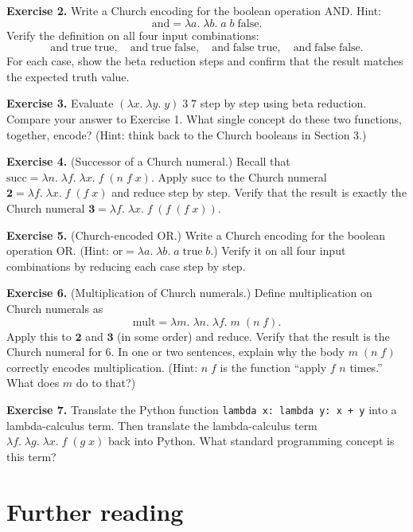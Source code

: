 \documentclass[11pt]{article}
\begin{document}
\bigskip
\textbf{Exercise 2.}\label{ex:lambda:2} Write a Church encoding for the
boolean operation AND\@. Hint:
\[
  \text{and} = \lambda a.\; \lambda b.\; a\; b\; \text{false}.
\]
Verify the definition on all four input combinations:
\[
  \text{and}\;\text{true}\;\text{true},\quad
  \text{and}\;\text{true}\;\text{false},\quad
  \text{and}\;\text{false}\;\text{true},\quad
  \text{and}\;\text{false}\;\text{false}.
\]
For each case, show the beta reduction steps and confirm that the result
matches the expected truth value.

\bigskip
\textbf{Exercise 3.}\label{ex:lambda:3} Evaluate $(\lambda x.\; \lambda y.\; y)\; 3\; 7$ step by step using beta reduction. Compare your answer to Exercise 1. What single concept do these two functions, together, encode? (Hint: think back to the Church booleans in Section 3.)

\bigskip
\textbf{Exercise 4.}\label{ex:lambda:4} (Successor of a Church numeral.) Recall that $\text{succ} = \lambda n.\; \lambda f.\; \lambda x.\; f\;(n\; f\; x)$. Apply $\text{succ}$ to the Church numeral $\mathbf{2} = \lambda f.\; \lambda x.\; f\;(f\; x)$ and reduce step by step. Verify that the result is exactly the Church numeral $\mathbf{3} = \lambda f.\; \lambda x.\; f\;(f\;(f\; x))$.

\bigskip
\textbf{Exercise 5.}\label{ex:lambda:5} (Church-encoded OR.) Write a Church encoding for the boolean operation OR\@. (Hint: $\text{or} = \lambda a.\; \lambda b.\; a\; \text{true}\; b$.) Verify it on all four input combinations by reducing each case step by step.

\bigskip
\textbf{Exercise 6.}\label{ex:lambda:6} (Multiplication of Church numerals.) Define multiplication on Church numerals as
\[
  \text{mult} = \lambda m.\; \lambda n.\; \lambda f.\; m\;(n\; f).
\]
Apply this to $\mathbf{2}$ and $\mathbf{3}$ (in some order) and reduce. Verify that the result is the Church numeral for $6$. In one or two sentences, explain why the body $m\;(n\; f)$ correctly encodes multiplication. (Hint: $n\; f$ is the function ``apply $f$ $n$ times.'' What does $m$ do to that?)

\bigskip
\textbf{Exercise 7.}\label{ex:lambda:7} Translate the Python function \texttt{lambda x: lambda y: x + y} into a lambda-calculus term. Then translate the lambda-calculus term $\lambda f.\;\lambda g.\;\lambda x.\; f\;(g\; x)$ back into Python. What standard programming concept is this term?

\section*{Further reading}
\end{document}
